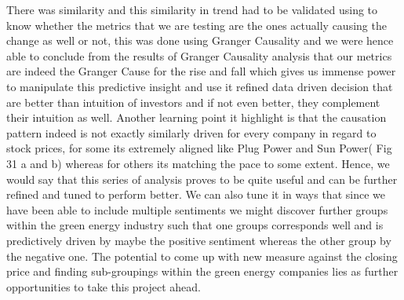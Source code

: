 \documentclass[sigconf, nonacm]{acmart}
\begin{document}
There was similarity and this similarity in trend had to be validated using to know whether the metrics that we are testing are the ones actually causing the change as well or not, this was done using Granger Causality and we were hence able to conclude from the results of Granger Causality analysis that our metrics are indeed the Granger Cause for the rise and fall which gives us immense power to manipulate this predictive insight and use it refined data driven decision that are better than intuition of investors and if not even better, they complement their intuition as well. Another learning point it highlight is that the causation pattern indeed is not exactly similarly driven for every company in regard to stock prices, for some its extremely aligned like Plug Power and Sun Power( Fig 31 a and b) whereas for others its matching the pace to some extent. Hence, we would say that this series of analysis proves to be quite useful and can be further refined and tuned to perform better. We can also tune it in ways that since we have been able to include multiple sentiments we might discover further groups within the green energy industry such that one groups corresponds well and is predictively driven by maybe the positive sentiment whereas the other group by the negative one. The potential to come up with new measure against the closing price and finding sub-groupings within the green energy companies lies as further opportunities to take this project ahead.





\end{document}
